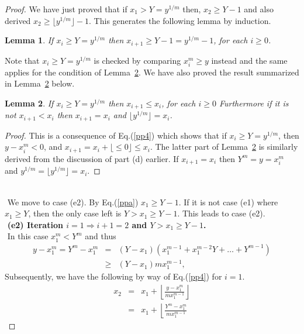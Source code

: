 \documentclass[11pt]{article}
\newtheorem{lem}{Lemma}
\newcommand{\floor}[1]{\lfloor #1 \rfloor}
\begin{document}
\begin{proof}
We have just proved that 
if $x_1 > Y = y^{1/m}$ then,
$x_2 \geq Y-1$ and also derived
$x_{ 2 } \geq \floor{y^{1/m}} -1$.
%
This generates the following lemma by induction.
\begin{lem}
\label{ppl1}
If $x_i \geq Y= y^{1/m}$ then $x_{i+1} \geq Y-1 = y^{1/m} -1$,
for each  $i \geq 0$.
\end{lem}
\bigskip
Note that $x_i \geq Y= y^{1/m}$ is checked by comparing
$x_i^m \geq y$ instead and the same applies for the condition
of  Lemma~\ref{ppl2}.
We have also proved the result summarized in Lemma~\ref{ppl2} below.
\begin{lem}
\label{ppl2}
If $x_i \geq Y= y^{1/m}$ then $x_{i+1} \leq x_i$, for each 
$i \geq 0$ 
Furthermore
if it is not $x_{i+1} < x_{i}$ then $x_{i+1} = x_{i}$ 
and $\lfloor y^{1/m} \rfloor = x_i$.
\end{lem}
\begin{proof}
This is a consequence of
Eq.(\ref{pp4}) which shows that if
$x_i \geq Y= y^{1/m}$, then  $y- x_i^m < 0$, and
$x_{i+1} = x_i + \floor{ \leq  0} \leq x_i$.
The latter part of Lemma~\ref{ppl2} is similarly derived from 
the discussion of part (d) earlier. If $x_{i+1} = x_{i}$ then
$Y^m = y =  x_i^m$ and  $y^{1/m} = \lfloor y^{1/m} \rfloor = x_i$.
\end{proof}
%
%
%
$ $ \\ $ $ 
We move to case (e2).
By Eq.(\ref{ppa}) $x_1 \geq Y-1$. If it is not case (e1)
where $x_1 \geq Y$, then the only case left is
$Y > x_1 \geq Y-1$. This leads to case (e2).
$ $ \\ $ $
{\bf (e2) Iteration $i=1 \Rightarrow i+1=2$ and $Y> x_{1} \geq Y-1$.}
$ $ \\ $ $
In this case $x_1^m < Y^m$ and thus
\begin{eqnarray}
\label{pp10}
y   - x_1^m  =
Y^m - x_1^m  &=& ( Y - x_1 )( x_1^{m-1} + x_{1}^{m-2}Y + \ldots + Y^{m-1})
\nonumber \\
          &\geq& (Y- x_1  ) m x_1^{m-1} ,
\end{eqnarray}
Subsequently, we have the following by way of Eq.(\ref{pp4}) for $i=1$.
\begin{eqnarray}
\label{pp10a}
x_{2  }
   & =  &
    x_1 + \left\lfloor
                \frac{y-x_1^m}{mx_1^{m-1}}
         \right\rfloor \nonumber    \\
   & =  &
    x_1 + \left\lfloor
                \frac{Y^m-x_1^m}{mx_1^{m-1}}

\end{eqnarray}
\end{proof}
\end{document}
